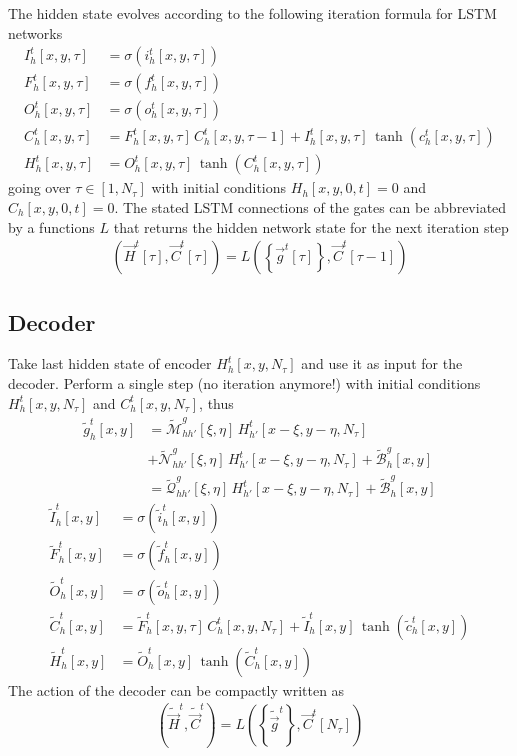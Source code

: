 \documentclass[10pt,a4paper]{article}
\begin{document}
The hidden state evolves according to the following iteration formula for LSTM networks
%
\begin{align}
I^t_h[x,y,\tau] & = \sigma (i^t_h[x,y,\tau]) \\
F^t_h[x,y,\tau] & = \sigma (f^t_h[x,y,\tau]) \\
O^t_h[x,y,\tau] & = \sigma (o^t_h[x,y,\tau]) \\
C^t_h[x,y,\tau] & = F^t_h[x,y,\tau] \, C^t_h[x,y,\tau-1] + I^t_h[x,y,\tau] \, \tanh (c^t_h[x,y,\tau]) \\
H^t_h[x,y,\tau] & = O^t_h[x,y,\tau]\, \tanh(C^t_h[x,y,\tau])
\end{align}
%
going over $\tau \in [1,N_\tau]$ with initial conditions $H_h[x,y,0,t]=0$ and $C_h[x,y,0,t]=0$.
%
The stated LSTM connections of the gates can be abbreviated by a functions $L$ that returns the hidden network state for the next iteration step
%
\begin{align}
\left(\vec{H}^t[\tau], \vec{C}^t[\tau] \right) = L \left( \left\{ \vec{g}^t[\tau] \right\}, \vec{C}^t[\tau-1] \right) 
\end{align}

\subsection{Decoder}

Take last hidden state of encoder $H^t_h[x,y,N_\tau]$ and use it as input for the decoder.
%
Perform a single step (no iteration anymore!) with initial conditions $H^t_h[x,y,N_\tau]$ and $C^t_h[x,y,N_\tau]$, thus
%
\begin{align}
\tilde{g}^t_h[x,y] & =  \tilde{\mathcal{M}}^{g}_{hh'} [\xi,\eta]\, H^t_{h'}[x-\xi, y-\eta,N_\tau] \\
& +  \tilde{\mathcal{N}}^{g}_{hh'}[\xi,\eta] \, H^t_{h'}[x-\xi, y-\eta, N_\tau] + \tilde{\mathcal{B}}^g_{h}[x,y] \\
& = \tilde{\mathcal{Q}}^{g}_{hh'} [\xi,\eta]\, H^t_{h'}[x-\xi, y-\eta,N_\tau] + \tilde{\mathcal{B}}^g_{h}[x,y]
\end{align}
%
\begin{align}
\tilde{I}^t_h[x,y] & = \sigma (\tilde{i}^t_h[x,y]) \\
\tilde{F}^t_h[x,y] & = \sigma (\tilde{f}^t_h[x,y]) \\
\tilde{O}^t_h[x,y] & = \sigma (\tilde{o}^t_h[x,y]) \\
\tilde{C}^t_h[x,y] & = \tilde{F}^t_h[x,y,\tau] \, C^t_h[x,y,N_\tau] + \tilde{I}^t_h[x,y] \, \tanh (\tilde{c}^t_h[x,y]) \\
\tilde{H}^t_h[x,y] & = \tilde{O}^t_h[x,y]\, \tanh(\tilde{C}^t_h[x,y])
\end{align}
%
The action of the decoder can be compactly written as
\begin{align}
\left(\tilde{\vec{H}}^t, \tilde{\vec{C}}^t \right) = L \left( \left\{ \tilde{\vec{g}}^t \right\}, \vec{C}^t[N_\tau] \right) 
\end{align}
\end{document}
